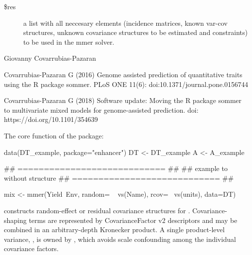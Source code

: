 \documentclass[a4paper]{book}
\begin{document}
%
\begin{Value}
\begin{description}

\item[\$res] a list with all neccesary elements (incidence matrices, known var-cov structures, unknown covariance structures to be estimated and constraints) to be used in the mmer solver.

\end{description}

\end{Value}
%
\begin{Author}\relax
Giovanny Covarrubias-Pazaran
\end{Author}
%
\begin{References}\relax
Covarrubias-Pazaran G (2016) Genome assisted prediction of quantitative traits using the R package sommer. PLoS ONE 11(6): doi:10.1371/journal.pone.0156744 

Covarrubias-Pazaran G (2018) Software update: Moving the R package sommer to
multivariate mixed models for genome-assisted prediction. doi:
https://doi.org/10.1101/354639
\end{References}
%
\begin{SeeAlso}\relax
The core function of the package: 
\end{SeeAlso}
%
\begin{Examples}
\begin{ExampleCode}

data(DT_example, package="enhancer")
DT <- DT_example
A <- A_example

## ============================ ##
## example to without structure
## ============================ ##

mix <- mmer(Yield~Env, 
            random= ~ vs(Name),
            rcov=~ vs(units),
            data=DT)

\end{ExampleCode}
\end{Examples}
%
\begin{Description}\relax
{} constructs random-effect or residual covariance structures for
.  Covariance-shaping terms are represented by CovarianceFactor v2
descriptors and may be combined in an arbitrary-depth Kronecker product.  A
single product-level variance, , is owned by , which
avoids scale confounding among the individual covariance factors.
\end{Description}
\end{document}
